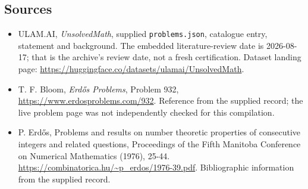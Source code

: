 \documentclass[11pt,a4paper]{article}
\begin{document}
\subsection{Sources}

{\small

\begin{itemize}

\item[\hypertarget{source:statement:1}{S1}] ULAM.AI, \emph{UnsolvedMath}, supplied \texttt{problems.json}, catalogue entry, statement and background. The embedded literature-review date is 2026-08-17; that is the archive’s review date, not a fresh certification. Dataset landing page: \url{https://huggingface.co/datasets/ulamai/UnsolvedMath}.

\item[\hypertarget{source:statement:2}{S2}] T. F. Bloom, \emph{Erdős Problems}, Problem 932, \url{https://www.erdosproblems.com/932}. Reference from the supplied record; the live problem page was not independently checked for this compilation.

\item[\hypertarget{source:statement:3}{S3}] P. Erdős, Problems and results on number theoretic properties of consecutive integers and related questions, Proceedings of the Fifth Manitoba Conference on Numerical Mathematics (1976), 25-44. \url{https://combinatorica.hu/~p_erdos/1976-39.pdf}. Bibliographic information from the supplied record.

\end{itemize}

}

\label{end:statement}
\end{document}
